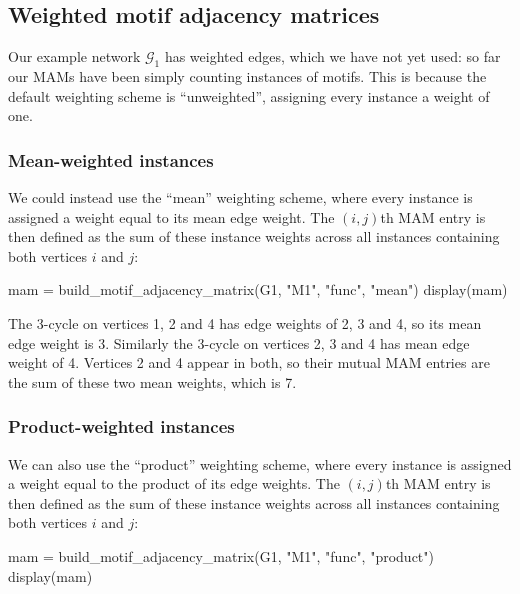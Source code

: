 \documentclass{article}
\begin{document}
\subsection{Weighted motif adjacency matrices}

Our example network $\mathcal{G}_1$ has weighted edges,
which we have not yet used:
so far our MAMs have been simply counting
instances of motifs.
This is because the default weighting scheme is
``unweighted'', assigning every instance a weight of one.

\subsubsection{Mean-weighted instances}

We could instead use the ``mean'' weighting scheme,
where every instance is assigned a weight equal to its
mean edge weight.
The $(i,j)$th MAM entry is then defined as the sum of these
instance weights across all instances containing
both vertices $i$ and $j$:

\begin{tcolorbox}[colback=black!5!white,colframe=black!15!white]
\begin{juliablock}
mam = build_motif_adjacency_matrix(G1, "M1", "func", "mean")
display(mam)
\end{juliablock}
\texttt{\obeylines\printpythontex}
\end{tcolorbox}

The 3-cycle on vertices 1, 2 and 4
has edge weights of 2, 3 and 4, so its mean edge weight is 3.
Similarly the 3-cycle on vertices 2, 3 and 4 has mean edge weight of 4.
Vertices 2 and 4 appear in both, so their mutual MAM entries are the
sum of these two mean weights, which is 7.

\subsubsection{Product-weighted instances}

We can also use the ``product'' weighting scheme,
where every instance is assigned a weight equal to the
product of its edge weights.
The $(i,j)$th MAM entry is then defined as the sum of these
instance weights across all instances containing
both vertices $i$ and $j$:

\begin{tcolorbox}[colback=black!5!white,colframe=black!15!white]
\begin{juliablock}
mam = build_motif_adjacency_matrix(G1, "M1", "func", "product")
display(mam)
\end{juliablock}
\texttt{\obeylines\printpythontex}
\end{tcolorbox}
\end{document}

